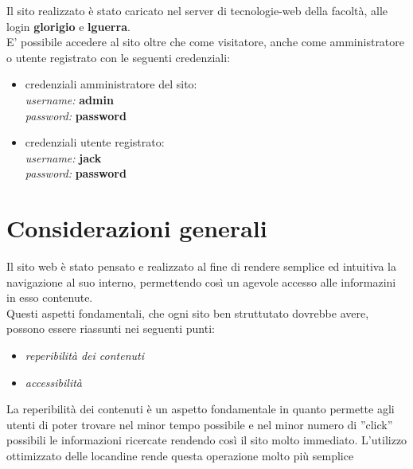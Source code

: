 \noindent Il sito realizzato è stato caricato nel server di tecnologie-web della facoltà, alle login \textbf{glorigio} e \textbf{lguerra}.\\

\noindent E' possibile accedere al sito oltre che come visitatore, anche come amministratore o utente registrato con le seguenti credenziali:
\begin{itemize}


\item credenziali amministratore del sito:\\
\textit{username:} \textbf{admin}\\
\textit{password:} \textbf{password}
\item credenziali utente registrato:\\
\textit{username:} \textbf{jack}\\
\textit{password:} \textbf{password}\\
\end{itemize}


\section{Considerazioni generali}

Il sito web è stato pensato e realizzato al fine di rendere semplice ed intuitiva la navigazione al suo interno, permettendo così un agevole accesso alle informazini in esso contenute.\\
Questi aspetti fondamentali, che ogni sito ben struttutato dovrebbe avere, possono essere riassunti nei seguenti punti:
\begin{itemize}
\item \textit{reperibilità dei contenuti}
\item \textit{accessibilità}
\end{itemize}

\n La reperibilità dei contenuti è un aspetto fondamentale in quanto permette agli utenti di poter trovare nel minor tempo possibile e nel minor numero di ''click'' possibili le informazioni ricercate rendendo così il sito molto immediato. L'utilizzo ottimizzato delle locandine rende questa operazione molto più semplice\\

